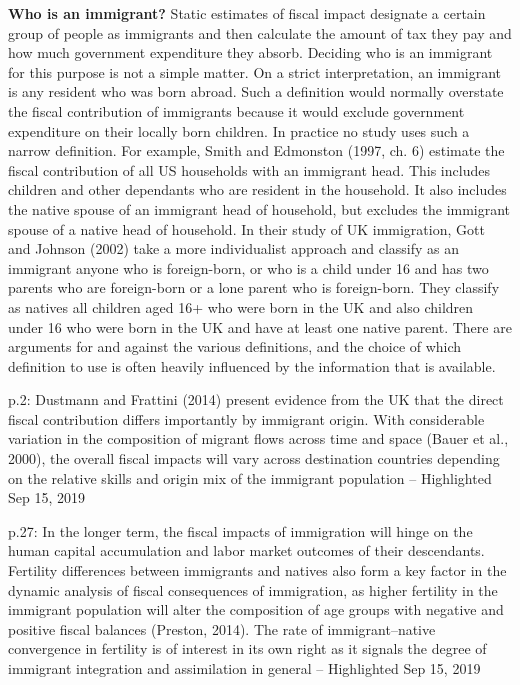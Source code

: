 \textbf{Who is an immigrant?}
Static estimates of fiscal impact designate a certain group of people as immigrants and then calculate the amount of tax they pay and how much government expenditure they absorb. Deciding who is an immigrant for this purpose is not a simple matter. On a strict interpretation, an immigrant is any resident who was born abroad. Such a definition would normally overstate the fiscal contribution of immigrants because it would exclude government expenditure on their locally born children. In practice no study uses such a narrow definition. For example, Smith and Edmonston (1997, ch. 6) estimate the fiscal contribution of all US households with an immigrant head. This includes children and other dependants who are resident in the household. It also includes the native spouse of an immigrant head of household, but excludes the immigrant spouse of a native head of household. In their study of UK immigration, Gott and Johnson (2002) take a more individualist approach and classify as an immigrant anyone who is foreign-born, or who is a child under 16 and has two parents who are foreign-born or a lone parent who is foreign-born. They classify as natives all children aged 16+ who were born in the UK and also children under 16 who were born in the UK and have at least one native parent. There are arguments for and against the various definitions, and the choice of which definition to use is often heavily influenced by the information that is available. \citep{Rowthorn:kk}



\citep{Bratsberg:2014cl}
p.2: Dustmann and Frattini (2014) present evidence from the UK that the direct fiscal contribution differs importantly by immigrant origin. With considerable variation in the composition of migrant flows across time and space (Bauer et al., 2000), the overall fiscal impacts will vary across destination countries depending on the relative skills and origin mix of the immigrant population -- Highlighted Sep 15, 2019

p.27: In the longer term, the fiscal impacts of immigration will hinge on the human capital accumulation and labor  market outcomes of their descendants. Fertility differences between immigrants and natives also form a key factor in the dynamic analysis of fiscal consequences of immigration, as higher fertility in the immigrant population will alter the composition of age groups with negative and positive fiscal balances (Preston, 2014). The rate of immigrant–native convergence in fertility is of interest in its own right as it signals the degree of immigrant integration and assimilation in general -- Highlighted Sep 15, 2019

